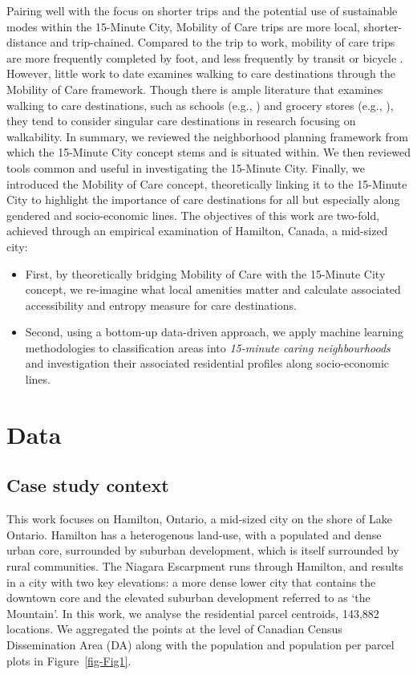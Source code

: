 \documentclass[
  authoryear,
  preprint,
  3p]{elsarticle}
\providecommand{\tightlist}{%
  \setlength{\itemsep}{0pt}\setlength{\parskip}{0pt}}\usepackage{longtable,booktabs,array}
\def\tightlist{}
\begin{document}
Pairing well with the focus on shorter trips and the potential use of
sustainable modes within the 15-Minute City, Mobility of Care trips are
more local, shorter-distance and trip-chained. Compared to the trip to
work, mobility of care trips are more frequently completed by foot, and
less frequently by transit or bicycle
\citep{ravensbergen2023exploratory}. However, little work to date
examines walking to care destinations through the Mobility of Care
framework. Though there is ample literature that examines walking to
care destinations, such as schools (e.g., \citep{RN7, RN8, RN9}) and
grocery stores (e.g., \citep{RN10, RN11}), they tend to consider
singular care destinations in research focusing on walkability. In
summary, we reviewed the neighborhood planning framework from which the
15-Minute City concept stems and is situated within. We then reviewed
tools common and useful in investigating the 15-Minute City. Finally, we
introduced the Mobility of Care concept, theoretically linking it to the
15-Minute City to highlight the importance of care destinations for all
but especially along gendered and socio-economic lines. The objectives
of this work are two-fold, achieved through an empirical examination of
Hamilton, Canada, a mid-sized city:

\begin{itemize}
\tightlist
\item
  First, by theoretically bridging Mobility of Care with the 15-Minute
  City concept, we re-imagine what local amenities matter and calculate
  associated accessibility and entropy measure for care destinations.
\item
  Second, using a bottom-up data-driven approach, we apply machine
  learning methodologies to classification areas into \emph{15-minute
  caring neighbourhoods} and investigation their associated residential
  profiles along socio-economic lines.
\end{itemize}

\section{Data}\label{data}

\subsection{Case study context}\label{case-study-context}

This work focuses on Hamilton, Ontario, a mid-sized city on the shore of
Lake Ontario. Hamilton has a heterogenous land-use, with a populated and
dense urban core, surrounded by suburban development, which is itself
surrounded by rural communities. The Niagara Escarpment runs through
Hamilton, and results in a city with two key elevations: a more dense
lower city that contains the downtown core and the elevated suburban
development referred to as `the Mountain'. In this work, we analyse the
residential parcel centroids, 143,882 locations. We aggregated the
points at the level of Canadian Census Dissemination Area (DA) along
with the population and population per parcel plots in
Figure~\ref{fig-Fig1}.
\end{document}
